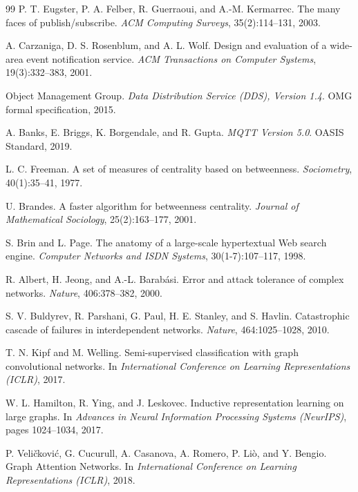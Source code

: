 \documentclass[sigconf,9pt,anonymous]{acmart}
\begin{document}
\begin{thebibliography}{99}
P. T. Eugster, P. A. Felber, R. Guerraoui, and A.-M. Kermarrec. The many faces of publish/subscribe. \emph{ACM Computing Surveys}, 35(2):114--131, 2003.

A. Carzaniga, D. S. Rosenblum, and A. L. Wolf. Design and evaluation of a wide-area event notification service. \emph{ACM Transactions on Computer Systems}, 19(3):332--383, 2001.

Object Management Group. \emph{Data Distribution Service (DDS), Version 1.4}. OMG formal specification, 2015.

A. Banks, E. Briggs, K. Borgendale, and R. Gupta. \emph{MQTT Version 5.0}. OASIS Standard, 2019.

L. C. Freeman. A set of measures of centrality based on betweenness. \emph{Sociometry}, 40(1):35--41, 1977.

U. Brandes. A faster algorithm for betweenness centrality. \emph{Journal of Mathematical Sociology}, 25(2):163--177, 2001.

S. Brin and L. Page. The anatomy of a large-scale hypertextual Web search engine. \emph{Computer Networks and ISDN Systems}, 30(1-7):107--117, 1998.

R. Albert, H. Jeong, and A.-L. Barabási. Error and attack tolerance of complex networks. \emph{Nature}, 406:378--382, 2000.

S. V. Buldyrev, R. Parshani, G. Paul, H. E. Stanley, and S. Havlin. Catastrophic cascade of failures in interdependent networks. \emph{Nature}, 464:1025--1028, 2010.

T. N. Kipf and M. Welling. Semi-supervised classification with graph convolutional networks. In \emph{International Conference on Learning Representations (ICLR)}, 2017.

W. L. Hamilton, R. Ying, and J. Leskovec. Inductive representation learning on large graphs. In \emph{Advances in Neural Information Processing Systems (NeurIPS)}, pages 1024--1034, 2017.

P. Veličković, G. Cucurull, A. Casanova, A. Romero, P. Liò, and Y. Bengio. Graph Attention Networks. In \emph{International Conference on Learning Representations (ICLR)}, 2018.


\end{thebibliography}
\end{document}

